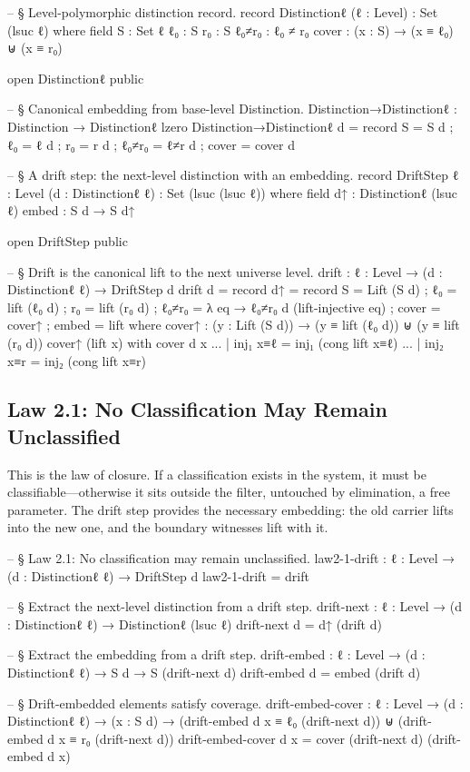 \documentclass[11pt,a4paper]{book}
\begin{document}
\begin{code}
-- § Level-polymorphic distinction record.
record Distinctionℓ (ℓ : Level) : Set (lsuc ℓ) where
  field
    S     : Set ℓ
    ℓ₀    : S
    r₀    : S
    ℓ₀≠r₀ : ℓ₀ ≠ r₀
    cover : (x : S) → (x ≡ ℓ₀) ⊎ (x ≡ r₀)

open Distinctionℓ public

-- § Canonical embedding from base-level Distinction.
Distinction→Distinctionℓ : Distinction → Distinctionℓ lzero
Distinction→Distinctionℓ d = record
  { S     = S d
  ; ℓ₀    = ℓ d
  ; r₀    = r d
  ; ℓ₀≠r₀ = ℓ≠r d
  ; cover = cover d
  }

-- § A drift step: the next-level distinction with an embedding.
record DriftStep {ℓ : Level} (d : Distinctionℓ ℓ) : Set (lsuc (lsuc ℓ)) where
  field
    d↑    : Distinctionℓ (lsuc ℓ)
    embed : S d → S d↑

open DriftStep public

-- § Drift is the canonical lift to the next universe level.
drift : {ℓ : Level} → (d : Distinctionℓ ℓ) → DriftStep d
drift d = record
  { d↑ = record
      { S     = Lift (S d)
      ; ℓ₀    = lift (ℓ₀ d)
      ; r₀    = lift (r₀ d)
      ; ℓ₀≠r₀ = λ eq → ℓ₀≠r₀ d (lift-injective eq)
    ; cover = cover↑
      }
  ; embed = lift
  }
  where
  cover↑ : (y : Lift (S d)) → (y ≡ lift (ℓ₀ d)) ⊎ (y ≡ lift (r₀ d))
  cover↑ (lift x) with cover d x
  ... | inj₁ x≡ℓ = inj₁ (cong lift x≡ℓ)
  ... | inj₂ x≡r = inj₂ (cong lift x≡r)
\end{code}

\subsection{Law 2.1: No Classification May Remain Unclassified}

This is the law of closure. If a classification exists in the system, it must be classifiable—otherwise it sits outside the filter, untouched by elimination, a free parameter. The drift step provides the necessary embedding: the old carrier lifts into the new one, and the boundary witnesses lift with it.

\begin{code}
-- § Law 2.1: No classification may remain unclassified.
law2-1-drift : {ℓ : Level} → (d : Distinctionℓ ℓ) → DriftStep d
law2-1-drift = drift

-- § Extract the next-level distinction from a drift step.
drift-next : {ℓ : Level} → (d : Distinctionℓ ℓ) → Distinctionℓ (lsuc ℓ)
drift-next d = d↑ (drift d)

-- § Extract the embedding from a drift step.
drift-embed : {ℓ : Level} → (d : Distinctionℓ ℓ) → S d → S (drift-next d)
drift-embed d = embed (drift d)

-- § Drift-embedded elements satisfy coverage.
drift-embed-cover : {ℓ : Level} → (d : Distinctionℓ ℓ) → (x : S d)
                 → (drift-embed d x ≡ ℓ₀ (drift-next d)) ⊎ (drift-embed d x ≡ r₀ (drift-next d))
drift-embed-cover d x = cover (drift-next d) (drift-embed d x)
\end{code}
\end{document}
